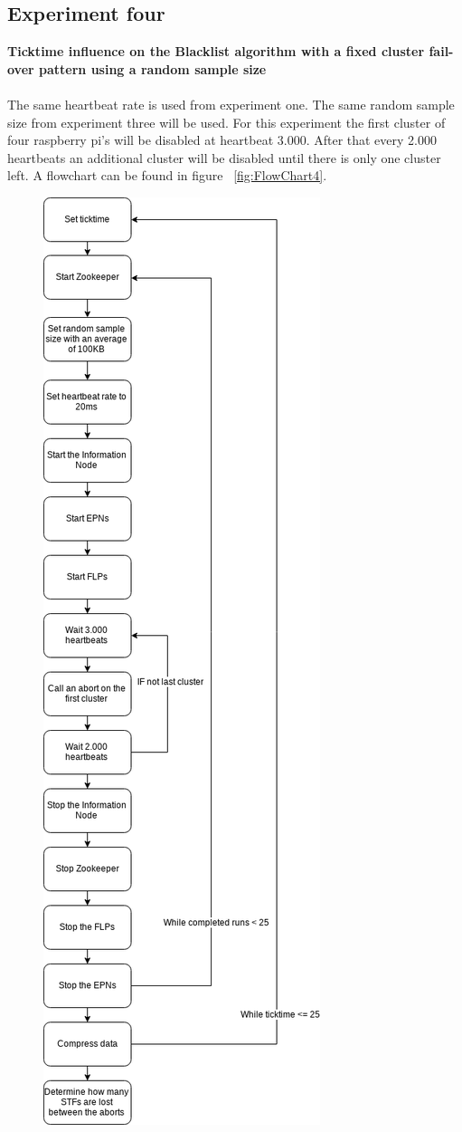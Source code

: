 \subsection{Experiment four}
\textbf{Ticktime influence on the Blacklist algorithm with a fixed cluster fail-over pattern using a random sample size}
\\~\\
The same heartbeat rate is used from experiment one. The same random sample size from experiment three will be used. For this experiment the first cluster of four raspberry pi's will be disabled at heartbeat 3.000. After that every 2.000 heartbeats an additional cluster will be disabled until there is only one cluster left. A flowchart can be found in figure ~\ref{fig:FlowChart4}.

\begin{figure}[htb]
	\centering
	\includegraphics[scale=0.3]{./graphics/ex4.png}

\end{figure}

